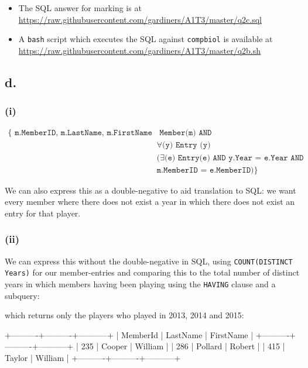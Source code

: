 \documentclass{article}
\begin{document}
\begin{itemize}
    \item The SQL answer for marking is at \url{https://raw.githubusercontent.com/gardiners/A1T3/master/q2c.sql}
    \item A \texttt{bash} script which executes the SQL against \texttt{compbiol} is available at  \url{https://raw.githubusercontent.com/gardiners/A1T3/master/q2b.sh}
\end{itemize}

\subsection{d.}

\subsubsection{(i)}

$$
\begin{aligned}
\{
\texttt{ m.MemberID, m.LastName, m.FirstName |} &\texttt{ Member(m) AND }\\
&\forall \texttt{(y) Entry (y)}\\
&(\exists \texttt{(e) Entry(e) AND y.Year = e.Year AND}\\
&\texttt{m.MemberID = e.MemberID})
\}
\end{aligned}
$$

We can also express this as a double-negative to aid translation to SQL: we want every member where there does not exist a year in which there does not exist an entry for that player.

\subsubsection{(ii)}

We can express this without the double-negative in SQL, using \texttt{COUNT(DISTINCT Years)} for our member-entries and comparing this to the total number of distinct years in which members having been playing using the \texttt{HAVING} clause and a subquery:


which returns only the players who played in 2013, 2014 and 2015:

\begin{bashinline}
+----------+----------+-----------+
| MemberId | LastName | FirstName |
+----------+----------+-----------+
|      235 | Cooper   | William   |
|      286 | Pollard  | Robert    |
|      415 | Taylor   | William   |
+----------+----------+-----------+
\end{bashinline}
\end{document}

